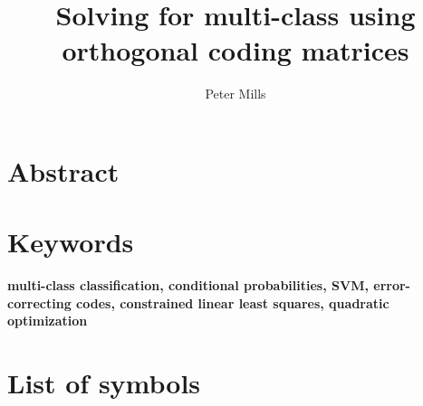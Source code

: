 \documentclass{article}
\title{Solving for multi-class using orthogonal coding matrices}
\author{Peter Mills}
\begin{document}
\maketitle

\section*{Abstract}



\section*{Keywords}
\textbf{multi-class classification, 
	conditional probabilities,
	SVM,
	error-correcting codes,
	constrained linear least squares,
	quadratic optimization}

\tableofcontents

\section*{List of symbols}





\newpage
{}

\end{document}
